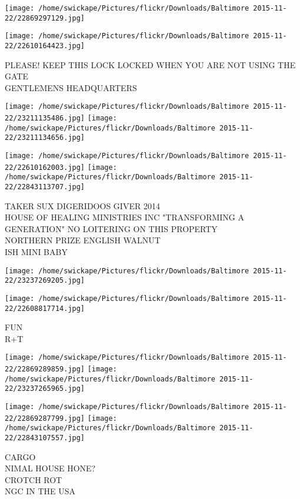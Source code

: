 \documentclass[10pt,letterpaper]{article}
\begin{document}
\texttt{[image: /home/swickape/Pictures/flickr/Downloads/Baltimore 2015-11-22/22869297129.jpg]}

\vspace{0.25in}
\texttt{[image: /home/swickape/Pictures/flickr/Downloads/Baltimore 2015-11-22/22610164423.jpg]}

PLEASE!  KEEP THIS LOCK LOCKED WHEN YOU ARE NOT USING THE GATE\\
GENTLEMENS HEADQUARTERS
\pagebreak

\texttt{[image: /home/swickape/Pictures/flickr/Downloads/Baltimore 2015-11-22/23211135486.jpg]}
\texttt{[image: /home/swickape/Pictures/flickr/Downloads/Baltimore 2015-11-22/23211134656.jpg]}

\texttt{[image: /home/swickape/Pictures/flickr/Downloads/Baltimore 2015-11-22/22610162003.jpg]}
\texttt{[image: /home/swickape/Pictures/flickr/Downloads/Baltimore 2015-11-22/22843113707.jpg]}

TAKER SUX DIGERIDOOS GIVER 2014\\
HOUSE OF HEALING MINISTRIES INC "TRANSFORMING A GENERATION" NO LOITERING ON THIS PROPERTY\\
NORTHERN PRIZE ENGLISH WALNUT\\
ISH MINI BABY
\pagebreak

\texttt{[image: /home/swickape/Pictures/flickr/Downloads/Baltimore 2015-11-22/23237269205.jpg]}

\vspace{0.25in}
\texttt{[image: /home/swickape/Pictures/flickr/Downloads/Baltimore 2015-11-22/22608817714.jpg]}

FUN\\
R+T
\pagebreak

\texttt{[image: /home/swickape/Pictures/flickr/Downloads/Baltimore 2015-11-22/22869289859.jpg]}
\texttt{[image: /home/swickape/Pictures/flickr/Downloads/Baltimore 2015-11-22/23237265965.jpg]}

\texttt{[image: /home/swickape/Pictures/flickr/Downloads/Baltimore 2015-11-22/22869287799.jpg]}
\texttt{[image: /home/swickape/Pictures/flickr/Downloads/Baltimore 2015-11-22/22843107557.jpg]}

CARGO\\
NIMAL HOUSE HONE?\\
CROTCH ROT\\
NGC IN THE USA
\pagebreak
\end{document}
